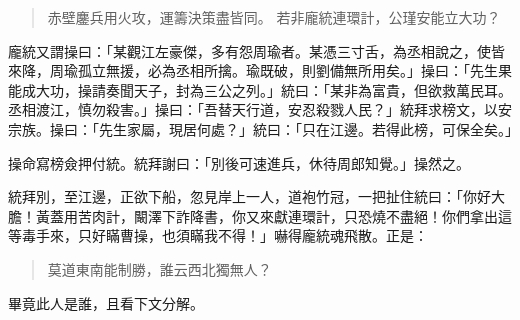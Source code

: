 \begin{quote}
赤壁鏖兵用火攻，運籌決策盡皆同。
若非龐統連環計，公瑾安能立大功？
\end{quote}

龐統又謂操曰：「某觀江左豪傑，多有怨周瑜者。某憑三寸舌，為丞相說之，使皆來降，周瑜孤立無援，必為丞相所擒。瑜既破，則劉備無所用矣。」操曰：「先生果能成大功，操請奏聞天子，封為三公之列。」統曰：「某非為富貴，但欲救萬民耳。丞相渡江，慎勿殺害。」操曰：「吾替天行道，安忍殺戮人民？」統拜求榜文，以安宗族。操曰：「先生家屬，現居何處？」統曰：「只在江邊。若得此榜，可保全矣。」

操命寫榜僉押付統。統拜謝曰：「別後可速進兵，休待周郎知覺。」操然之。

統拜別，至江邊，正欲下船，忽見岸上一人，道袍竹冠，一把扯住統曰：「你好大膽！黃蓋用苦肉計，闞澤下詐降書，你又來獻連環計，只恐燒不盡絕！你們拿出這等毒手來，只好瞞曹操，也須瞞我不得！」嚇得龐統魂飛散。正是：

\begin{quote}
莫道東南能制勝，誰云西北獨無人？
\end{quote}

畢竟此人是誰，且看下文分解。
